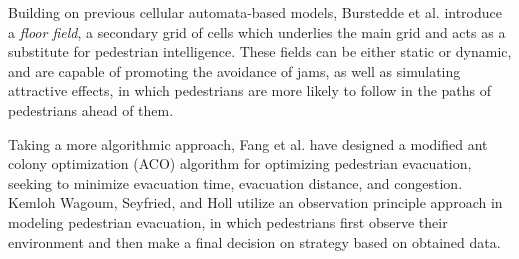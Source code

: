\documentclass[12pt]{article}
\begin{document}
Building on previous cellular automata-based models, Burstedde et al.
\cite{burstedde2001simulation} introduce a \textit{floor field}, a secondary
grid of cells which underlies the main grid and acts as a substitute for
pedestrian intelligence. These fields can be either static or dynamic, and are
capable of promoting the avoidance of jams, as well as simulating attractive
effects, in which pedestrians are more likely to follow in the paths of
pedestrians ahead of them.

Taking a more algorithmic approach, Fang et al. \cite{fang2011hierarchical} have
designed a modified ant colony optimization (ACO) algorithm for optimizing
pedestrian evacuation, seeking to minimize evacuation time, evacuation distance,
and congestion. Kemloh Wagoum, Seyfried, and Holl \cite{kemloh2012modeling}
utilize an observation principle approach in modeling pedestrian evacuation,
in which pedestrians first observe their environment and then make a final
decision on strategy based on obtained data.







{}

\end{document}
